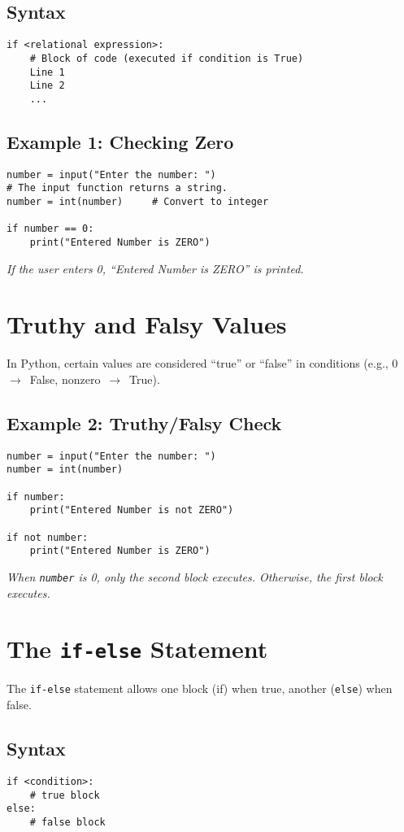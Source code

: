 \subsection*{Syntax}
\begin{verbatim}
if <relational expression>:
    # Block of code (executed if condition is True)
    Line 1
    Line 2
    ...
\end{verbatim}

\subsection*{Example 1: Checking Zero}
\begin{verbatim}
number = input("Enter the number: ")
# The input function returns a string.
number = int(number)     # Convert to integer

if number == 0:
    print("Entered Number is ZERO")
\end{verbatim}
\textit{If the user enters 0, ``Entered Number is ZERO'' is printed.}


\section{Truthy and Falsy Values}

In Python, certain values are considered ``true'' or ``false'' in conditions (e.g., 0~$\rightarrow$~False, nonzero~$\rightarrow$~True).

\subsection*{Example 2: Truthy/Falsy Check}
\begin{verbatim}
number = input("Enter the number: ")
number = int(number)

if number:
    print("Entered Number is not ZERO")

if not number:
    print("Entered Number is ZERO")
\end{verbatim}
\textit{When \texttt{number} is 0, only the second block executes. Otherwise, the first block executes.}


\section{The \texttt{if-else} Statement}

The \texttt{if-else} statement allows one block (if) when true, another (\texttt{else}) when false.

\subsection*{Syntax}
\begin{verbatim}
if <condition>:
    # true block
else:
    # false block
\end{verbatim}


